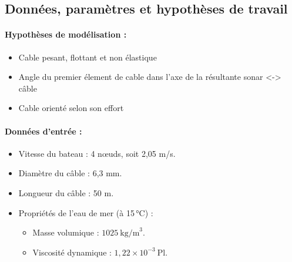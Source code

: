 \documentclass[12pt,a4paper]{report}
\begin{document}
\subsection{Données, paramètres et hypothèses de travail}

\paragraph{Hypothèses de modélisation :}
\begin{itemize}
    \item Cable pesant, flottant et non élastique
    \item Angle du premier élement de cable dans l'axe de la résultante sonar <-> câble
    \item Cable orienté selon son effort
\end{itemize}

\paragraph{Données d’entrée :}
\begin{itemize}
  \item Vitesse du bateau : 4 nœuds, soit 2{,}05 m/s.
  \item Diamètre du câble : 6{,}3 mm.
  \item Longueur du câble : 50 m.
  \item Propriétés de l’eau de mer (à 15\,°C) :
  \begin{itemize}
    \item Masse volumique : \( 1025~\text{kg/m}^3 \).
    \item Viscosité dynamique : \( 1{,}22 \times 10^{-3}~\text{Pl} \).
  \end{itemize}
\end{itemize}
\end{document}

